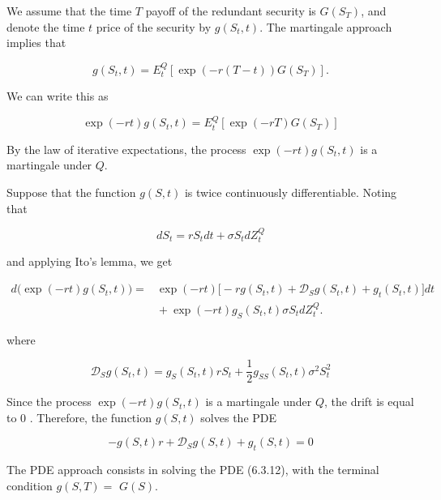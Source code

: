 \documentclass[\topdir/lecture\_notes.tex]{subfiles}
\begin{document}
We assume that the time $T$ payoff of the redundant security is $G\left(S_{T}\right)$, and denote the time $t$ price of the security by $g\left(S_{t}, t\right)$. The martingale approach implies that

\begin{equation}
g\left(S_{t}, t\right)=E_{t}^{Q}\left[\exp (-r(T-t)) G\left(S_{T}\right)\right] .
\end{equation}

We can write this as

\begin{equation}
\exp (-r t) g\left(S_{t}, t\right)=E_{t}^{Q}\left[\exp (-r T) G\left(S_{T}\right)\right] \label{eq:6.3.9}
\end{equation}

By the law of iterative expectations, the process $\exp (-r t) g\left(S_{t}, t\right)$ is a martingale under $Q$.

Suppose that the function $g(S, t)$ is twice continuously differentiable. Noting that

\begin{equation}
d S_{t}=r S_{t} d t+\sigma S_{t} d Z_{t}^{Q}
\end{equation}

and applying Ito's lemma, we get

\begin{align}
d\big(\exp (-r t) g(S_{t}, t)\big)={}& \exp (-r t)\Big[-r g(S_{t}, t)+\mathcal{D}_{S} g(S_{t}, t)+g_{t}(S_{t}, t)\Big] d t \nonumber \\
&{}+ \exp (-r t) g_{S}(S_{t}, t) \sigma S_{t} d Z_{t}^{Q}. \label{eq:6.3.10}
\end{align}

where

\begin{equation}
\mathcal{D}_{S} g\left(S_{t}, t\right)=g_{S}\left(S_{t}, t\right) r S_{t}+\frac{1}{2} g_{S S}\left(S_{t}, t\right) \sigma^{2} S_{t}^{2} \label{eq:6.3.11}
\end{equation}

Since the process $\exp (-r t) g\left(S_{t}, t\right)$ is a martingale under $Q$, the drift is equal to 0 . Therefore, the function $g(S, t)$ solves the PDE

\begin{equation}
-g(S, t) r+\mathcal{D}_{S} g(S, t)+g_{t}(S, t)=0 \label{eq:6.3.12}
\end{equation}

The PDE approach consists in solving the PDE (6.3.12), with the terminal condition $g(S, T)=$ $G(S)$.
\end{document}
